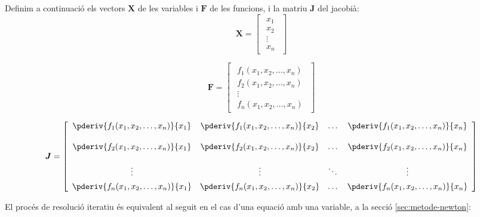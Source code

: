 Definim a continuació els vectors $\boldsymbol{X}$ de les variables i $\boldsymbol{F}$ de les funcions, i la matriu  $\boldsymbol{J}$ del jacobià:
\begin{equation}
	\boldsymbol{X} =  
	\begin{bmatrix}\begin{array}{c} 
			x_1 \\
			x_2 \\
			\vdots{} \\
			x_n
	\end{array}\end{bmatrix}
\end{equation}

\begin{equation}
	\boldsymbol{F} =  
	\begin{bmatrix}\begin{array}{c} 
			f_1(x_1, x_2, \dots, x_n) \\[1ex]
			f_2(x_1, x_2, \dots, x_n) \\
			\vdots{} \\
			f_n(x_1, x_2, \dots, x_n)
	\end{array}\end{bmatrix}
\end{equation}

\begin{equation}
	\boldsymbol{J} =  
	\begin{bmatrix}\begin{array}{cccc} 
			\displaystyle
			\pderiv{f_1(x_1, x_2, \dots, x_n)}{x_1} & 
			\displaystyle
			\pderiv{f_1(x_1, x_2, \dots, x_n)}{x_2} & 
			\dots{} &
			\displaystyle
			\pderiv{f_1(x_1, x_2, \dots, x_n)}{x_n} \\[3ex]
			\displaystyle
			\pderiv{f_2(x_1, x_2, \dots, x_n)}{x_1} & 
			\displaystyle
			\pderiv{f_2(x_1, x_2, \dots, x_n)}{x_2} & 
			\dots{} &
			\displaystyle
			\pderiv{f_2(x_1, x_2, \dots, x_n)}{x_n} \\[3ex]
			\vdots{} & \vdots{} & \ddots{} & \vdots{} \\[1ex]
			\displaystyle
			\pderiv{f_n(x_1, x_2, \dots, x_n)}{x_1} & 
			\displaystyle
			\pderiv{f_n(x_1, x_2, \dots, x_n)}{x_2} & 
			\dots{} &
			\displaystyle
			\pderiv{f_n(x_1, x_2, \dots, x_n)}{x_n}
	\end{array}\end{bmatrix}
\end{equation}


El procés de resolució iteratiu és equivalent al seguit en el cas d'una  equació amb una variable, a la secció \vref{sec:metode-newton}:

